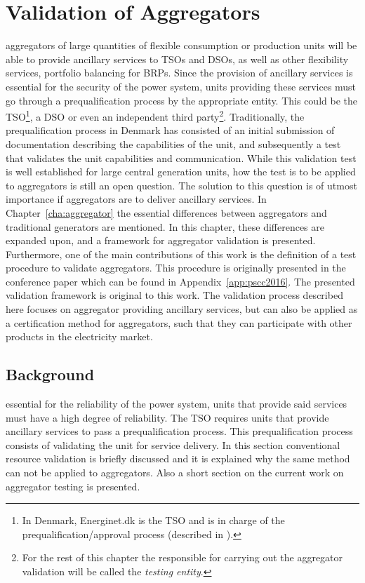 \chapter{Validation of Aggregators}
\label{cha:validation}
 aggregators of large quantities of flexible consumption or production units will be able to provide ancillary services to TSOs and DSOs, as well as other flexibility services, \eg portfolio balancing for BRPs. Since the provision of ancillary services is essential for the security of the power system, units providing these services must go through a prequalification process by the appropriate entity. This could be the TSO\footnote{In Denmark, Energinet.dk is the TSO and is in charge of the prequalification/approval process (described in \cite{EnerginetAncillary}).}, a DSO or even an independent third party\footnote{For the rest of this chapter the responsible for carrying out the aggregator validation will be called the \emph{testing entity}.}. Traditionally, the prequalification process in Denmark has consisted of an initial submission of documentation describing the capabilities of the unit, and subsequently a test that validates the unit capabilities and communication. While this validation test is well established for large central generation units, how the test is to be applied to aggregators is still an open question. The solution to this question is of utmost importance if aggregators are to deliver ancillary services. In Chapter~\ref{cha:aggregator} the essential differences between aggregators and traditional generators are mentioned. In this chapter, these differences are expanded upon, and a framework for aggregator validation is presented. Furthermore, one of the main contributions of this work is the definition of a test procedure to validate aggregators. This procedure is originally presented in the conference paper which can be found in Appendix~\ref{app:pscc2016}. The presented validation framework is original to this work. The validation process described here focuses on aggregator providing ancillary services, but can also be applied as a certification method for aggregators, such that they can participate with other products in the electricity market.

\section{Background}
 essential for the reliability of the power system, units that provide said services must have a high degree of reliability. The TSO requires units that provide ancillary services to pass a prequalification process. This prequalification process consists of validating the unit for service delivery. In this section conventional resource validation is briefly discussed and it is explained why the same method can not be applied to aggregators. Also a short section on the current work on aggregator testing is presented.
